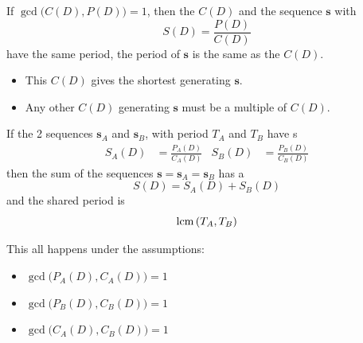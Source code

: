 \begin{theorem}\label{thm:GCD_Connection_Polynomial_S_Sequence}
  If $\gcd \bigl( C(D), P(D) \bigr) = 1$, then the  $C(D)$ and the sequence $\mathbf{s}$ with 
  \begin{equation*}
    S(D) = \frac{P(D)}{C(D)}
  \end{equation*}
  have the same period, the period of $\mathbf{s}$ is the same as the  $C(D)$.
\end{theorem}
\begin{itemize}[noitemsep]
\item This $C(D)$ gives the shortest  generating $\mathbf{s}$.
\item Any other $C(D)$ generating $\mathbf{s}$ must be a multiple of $C(D)$.
\end{itemize}

\begin{theorem}\label{thm:Adding_D_Transform_Sequence}
  If the 2 sequences $\mathbf{s}_{A}$ and $\mathbf{s}_{B}$, with period $T_{A}$ and $T_{B}$ have s
  \begin{align*}
    S_{A}(D) &= \frac{P_{A}(D)}{C_{A}(D)} & S_{B}(D) &= \frac{P_{B}(D)}{C_{B}(D)}
  \end{align*}
  then the sum of the sequences $\mathbf{s} = \mathbf{s}_{A} = \mathbf{s}_{B}$ has a 
  \begin{equation}\label{eq:Add_D_Transform_Sequences}
    S(D) = S_{A}(D) + S_{B}(D)
  \end{equation}
  and the shared period is
  \begin{equation}\label{eq:Period_Add_D_Transform_Sequences}
    \operatorname{\operatorname{lcm}} \left( T_{A}, T_{B} \right)
  \end{equation}

  This all happens under the assumptions:
  \begin{itemize}[noitemsep]
  \item $\gcd \bigl( P_{A}(D), C_{A}(D) \bigr) = 1$
  \item $\gcd \bigl( P_{B}(D), C_{B}(D) \bigr) = 1$
  \item $\gcd \bigl( C_{A}(D), C_{B}(D) \bigr) = 1$
  \end{itemize}
\end{theorem}

